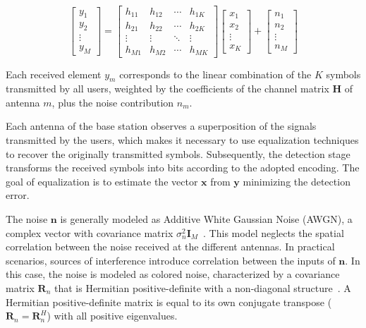 \documentclass[12pt]{article}
\begin{document}
\begin{equation}
\begin{bmatrix}
y_1 \\
y_2 \\
\vdots \\
y_M
\end{bmatrix}
=
\begin{bmatrix}
h_{11} & h_{12} & \cdots & h_{1K} \\
h_{21} & h_{22} & \cdots & h_{2K} \\
\vdots & \vdots & \ddots & \vdots \\
h_{M1} & h_{M2} & \cdots & h_{MK}
\end{bmatrix}
\begin{bmatrix}
x_1 \\
x_2 \\
\vdots \\
x_K
\end{bmatrix}
+
\begin{bmatrix}
n_1 \\
n_2 \\
\vdots \\
n_M
\end{bmatrix}
\end{equation}

Each received element $y_m$ corresponds to the linear combination of the $K$ symbols
transmitted by all users, weighted by the coefficients of the channel matrix $\mathbf{H}$ of antenna $m$, plus the noise contribution $n_m$.

Each antenna of the base station observes a superposition of the signals transmitted
by the users, which makes it necessary to use equalization techniques
to recover the originally transmitted symbols. Subsequently, the detection stage transforms the received symbols into bits according to the adopted encoding. The goal of equalization is to estimate the vector $\mathbf{x}$ from $\mathbf{y}$ minimizing the detection error.

The noise $\mathbf{n}$ is generally modeled as Additive White Gaussian Noise
(AWGN), a complex vector with covariance matrix $\sigma_n^2
\mathbf{I}_M$~\cite{rodriguezsanchez2020, li2019cd, li2023iotj,
wang2023bdnsepa}. This model neglects the spatial correlation between the noise received at the different antennas. In practical scenarios, sources of interference introduce correlation between the inputs of $\mathbf{n}$. In this case, the noise is modeled as colored noise, characterized by a
covariance matrix $\mathbf{R}_n$ that is Hermitian positive-definite with a non-diagonal structure~\cite{zhao2025jsac}. A Hermitian positive-definite matrix is equal to its own conjugate transpose ($\mathbf{R}_n =
\mathbf{R}_n^H$) with all positive eigenvalues.
\end{document}

